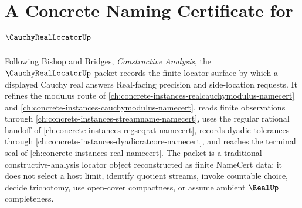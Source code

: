 \chapter{A Concrete Naming Certificate for $\CauchyRealLocatorUp$}
\label{ch:concrete-instances-cauchy-real-locator-namecert}

Following Bishop and Bridges, \emph{Constructive Analysis}, the $\CauchyRealLocatorUp$ packet records the finite locator surface by which a displayed Cauchy real answers Real-facing precision and side-location requests. It refines the modulus route of \autoref{ch:concrete-instances-realcauchymodulus-namecert} and \autoref{ch:concrete-instances-cauchymodulus-namecert}, reads finite observations through \autoref{ch:concrete-instances-streamname-namecert}, uses the regular rational handoff of \autoref{ch:concrete-instances-regseqrat-namecert}, records dyadic tolerances through \autoref{ch:concrete-instances-dyadicratcore-namecert}, and reaches the terminal seal of \autoref{ch:concrete-instances-real-namecert}. The packet is a traditional constructive-analysis locator object reconstructed as finite NameCert data; it does not select a host limit, identify quotient streams, invoke countable choice, decide trichotomy, use open-cover compactness, or assume ambient $\RealUp$ completeness.

